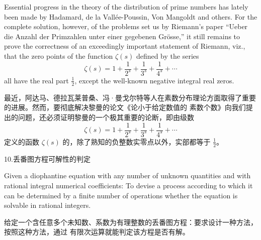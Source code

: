 \documentclass{mojing-translation}
\begin{document}
\begin{pairs}
\omission


\begin{original}
Essential progress in the theory of the distribution of prime numbers has lately been made by
Hadamard, de la Vall\'ee-Poussin, Von Mangoldt and others. For the complete solution, however,
of the problems set us by Riemann's paper ``Ueber die Anzahl der Primzahlen unter einer
gegebenen Gr\"osse,'' it still remains to prove the correctness of an exceedingly important
statement of Riemann, viz., that the zero points of the function $\zeta(s)$ defined by the
series
\[
  \zeta(s)=1+\frac{1}{2^s}+\frac{1}{3^s}+\frac{1}{4^s}+\dotsb
\]
all have the real part $\frac12$, except the well-known negative integral real zeros.
\end{original}
\begin{translated}
最近，阿达马、德拉瓦莱普桑、冯·曼戈尔特等人在素数分布理论方面取得了重要的进展。然而，要彻底解决黎曼的论文《论小于给定数值的
素数个数》向我们提出的问题，还必须证明黎曼的一个极其重要的论断，即由级数
\[
  \zeta(s)=1+\frac{1}{2^s}+\frac{1}{3^s}+\frac{1}{4^s}+\dotsb
\]
定义的函数 $\zeta(s)$ 的，除了熟知的负整数实零点以外，实部都等于
$\frac12$。
\end{translated}

\omission

            {10.\quad 丢番图方程可解性的判定}

\begin{original}
Given a diophantine equation with any number of unknown quantities and with rational integral
numerical coefficients: To devise a process according to which it can be determined by a
finite number of operations whether the equation is solvable in rational integers.
\end{original}
\begin{translated}
给定一个含任意多个未知数、系数为有理整数的丢番图方程：要求设计一种方法，按照这种方法，通过
有限次运算就能判定该方程是否有解。
\end{translated}

\end{pairs}
\end{document}
